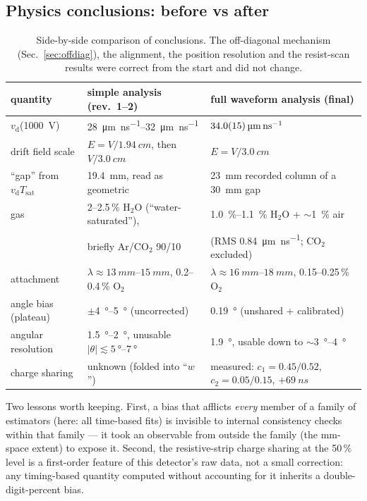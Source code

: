 \documentclass[11pt,a4paper]{article}
\newcommand{\vd}{v_{\mathrm{d}}}
\newcommand{\Tsat}{T_{\mathrm{sat}}}
\newcommand{\umns}{\micro\meter\per\nano\second}
\begin{document}
\subsection{Physics conclusions: before vs after}

\begin{table}[H]
\centering\small
\setlength{\tabcolsep}{5pt}%
\begin{tabular}{lll}
\toprule
quantity & simple analysis (rev.\ 1--2) & full waveform analysis (final) \\
\midrule
$\vd$(\SI{1000}{V}) & \SIrange{28}{32}{\umns} & $\SI{34\pm1.5}{\umns}$ \\
drift field scale & $E=V/\SI{1.94}{cm}$, then $V/\SI{3.0}{cm}$
  & $E=V/\SI{3.0}{cm}$ \\
``gap'' from $\vd\Tsat$ & \SI{19.4}{mm}, read as geometric
  & \SI{23}{mm} recorded column of a \SI{30}{mm} gap \\
gas & 2--2.5\,\% H$_2$O (``water-saturated''),
  & \SIrange{1.0}{1.1}{\percent} H$_2$O + $\sim$\SI{1}{\percent} air \\
  & briefly Ar/CO$_2$ 90/10 & (RMS \SI{0.84}{\umns}; CO$_2$ excluded) \\
attachment & $\lambda\approx\SIrange{13}{15}{mm}$, 0.2--0.4\,\% O$_2$
  & $\lambda\approx\SIrange{16}{18}{mm}$, 0.15--0.25\,\% O$_2$ \\
angle bias (plateau) & $\pm$\SIrange{4}{5}{\degree} (uncorrected)
  & \SI{0.19}{\degree} (unshared + calibrated) \\
angular resolution & \SIrange{1.5}{2}{\degree}, unusable
  $|\theta|\lesssim\SIrange{5}{7}{\degree}$
  & \SI{1.9}{\degree}, usable down to $\sim$\SIrange{3}{4}{\degree} \\
charge sharing & unknown (folded into ``$w$'')
  & measured: $c_1=0.45/0.52$, $c_2=0.05/0.15$, $+\SI{69}{ns}$ \\
\bottomrule
\end{tabular}
\caption{Side-by-side comparison of conclusions.  The off-diagonal
mechanism (Sec.~\ref{sec:offdiag}), the alignment, the position resolution
and the resist-scan results were correct from the start and did not
change.}
\label{tab:beforeafter}
\end{table}

Two lessons worth keeping.  First, a bias that afflicts \emph{every}
member of a family of estimators (here: all time-based fits) is invisible
to internal consistency checks within that family --- it took an
observable from outside the family (the mm-space extent) to expose it.
Second, the resistive-strip charge sharing at the 50\,\% level is a
first-order feature of this detector's raw data, not a small correction:
any timing-based quantity computed without accounting for it inherits a
double-digit-percent bias.
\end{document}

